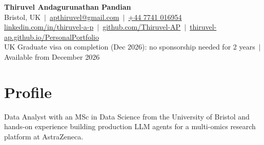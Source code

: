 \documentclass[a4paper,10pt]{article}
\begin{document}
\fontsize{10.5}{12.6}\selectfont

\begin{center}
  {\LARGE\bfseries Thiruvel Andagurunathan Pandian}\\[3pt]
  Bristol, UK \,$|$\, \href{mailto:apthiruvel@gmail.com}{apthiruvel@gmail.com} \,$|$\, \href{tel:+447741016954}{+44 7741 016954}\\[1pt]
\href{https://www.linkedin.com/in/thiruvel-a-p/}{linkedin.com/in/thiruvel-a-p} \,$|$\, \href{https://github.com/Thiruvel-AP}{github.com/Thiruvel-AP} \,$|$\, \href{https://thiruvel-ap.github.io/PersonalPortfolio/}{thiruvel-ap.github.io/PersonalPortfolio}\\[1pt]
  UK Graduate visa on completion (Dec 2026): no sponsorship needed for 2 years \,$|$\, Available from December 2026
\end{center}

\section{Profile}
Data Analyst with an MSc in Data Science from the University of Bristol and hands-on experience building production LLM agents for a multi-omics research platform at AstraZeneca.

\end{document}
